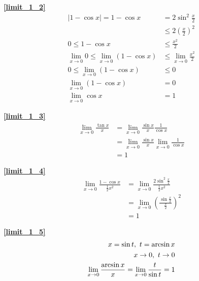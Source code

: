 \textbf{\large \ref{limit_1_2}}
\begin{displaymath}
    \begin{split}
        \left|1-\cos x\right|=1-\cos x&=2\sin^2 \frac{x}{2}\\
        &\leqslant 2\left(\frac{x}{2}\right)^2\\
        0\leqslant 1-\cos x &\leqslant \frac{x^2}{2}\\
        \lim\limits_{x\to 0}0\leqslant\lim\limits_{x\to 0}\left(1-\cos x\right)&\leqslant\lim\limits_{x\to 0}{\frac{x^2}{2}}\\
        0\leqslant\lim\limits_{x\to 0}\left(1-\cos x\right)&\leqslant 0\\
        \lim\limits_{x\to 0}\left(1-\cos x\right) &=0\\
        \lim\limits_{x\to 0}\cos x&=1
    \end{split}
\end{displaymath}

\textbf{\large \ref{limit_1_3}}
\begin{displaymath}
    \begin{split}
        \lim\limits_{x\to 0}\frac{\tan x}{x}&=\lim\limits_{x\to 0}\frac{\sin x}{x}\frac{1}{\cos x}\\
        &=\lim\limits_{x\to 0}\frac{\sin x}{x}\lim\limits_{x\to 0}\frac{1}{\cos x}\\
        &=1
    \end{split}
\end{displaymath}

\textbf{\large \ref{limit_1_4}}
\begin{displaymath}
    \begin{split}
        \lim\limits_{x\to 0}\frac{1-\cos x}{\frac{1}{2}x^2}&=\lim\limits_{x\to 0}\frac{2\sin^2\frac{x}{2}}{\frac{1}{2}x^2}\\
        &=\lim\limits_{x\to 0}\left(\frac{\sin \frac{x}{2}}{\frac{x}{2}}\right)^2\\
        &=1
    \end{split}
\end{displaymath}

\textbf{\large \ref{limit_1_5}}
\begin{displaymath}
    \centering
    \begin{split}
        x=\sin t,\ t=\arcsin x\\ 
        x\rightarrow 0,\ t\rightarrow 0\\
        \lim\limits_{x\to 0}\frac{\arcsin x}{x}=\lim\limits_{x\to 0}\frac{t}{\sin t}=1
    \end{split}
\end{displaymath}

